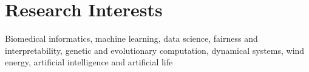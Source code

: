 \section*{Research Interests}
Biomedical informatics, 
machine learning, 
data science, 
fairness and interpretability,
genetic and evolutionary computation,  
dynamical systems, 
wind energy, 
artificial intelligence and 
artificial life
